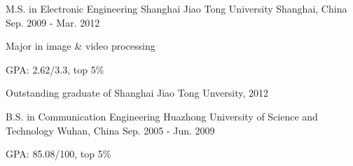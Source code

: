 

\begin{cventries}

  \cventry
    {M.S. in Electronic Engineering} %
    {Shanghai Jiao Tong University} %
    {Shanghai, China} %
    {Sep. 2009 - Mar. 2012} %
    {
      \begin{cvitems} %
        \item {Major in image \& video processing}
        \item {GPA: 2.62/3.3, top 5\%}
        \item {Outstanding graduate of Shanghai Jiao Tong Unversity, 2012}
      \end{cvitems}
    }

  \cventry
    {B.S. in Communication Engineering} %
    {Huazhong University of Science and Technology} %
    {Wuhan, China} %
    {Sep. 2005 - Jun. 2009} %
    {
      \begin{cvitems} %
        \item {GPA: 85.08/100, top 5\%}
      \end{cvitems}
    }

\end{cventries}
